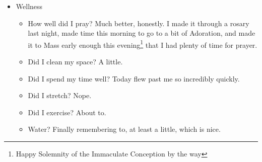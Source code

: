\documentclass[12pt]{article}[titlepage]
\newcommand{\1}{\={a}}
\newcommand{\2}{\={e}}
\newcommand{\3}{\={\i}}
\newcommand{\4}{\=o}
\newcommand{\5}{\=u}
\newcommand{\6}{\={A}}
\renewcommand{\,}{\textsuperscript{,}}
\begin{document}
\begin{itemize}
\begin{itemize}
\end{itemize}
\item Wellness
\begin{itemize}
\item How well did I pray? Much better, honestly. I made it through a rosary last night, made time this morning to go to a bit of Adoration, and made it to Mass early enough this evening\footnote{Happy Solemnity of the Immaculate Conception by the way} that I had plenty of time for prayer.
\item Did I clean my space? A little.
\item Did I spend my time well? Today flew past me so incredibly quickly.
\item Did I stretch? Nope.
\item Did I exercise? About to.
\item Water? Finally remembering to, at least a little, which is nice.
\end{itemize}
\end{itemize}
\end{document}
